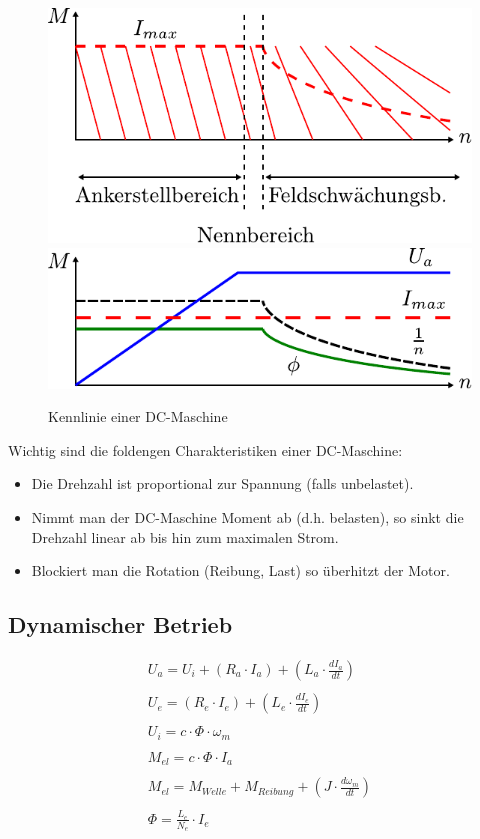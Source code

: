 \begin{figure}[h!]
\centering
\includegraphics[scale=\schscale]{dc-motor-plot1.pdf}
\includegraphics[scale=\schscale]{dc-motor-plot2.pdf}
\caption{Kennlinie einer DC-Maschine}
\label{fig:dc-motor-kennlinie}
\end{figure}

\noindent
Wichtig sind die foldengen Charakteristiken einer DC-Maschine:

\begin{itemize}
	\item Die Drehzahl ist proportional zur Spannung (falls unbelastet).
	\item Nimmt man der DC-Maschine Moment ab (d.h. belasten), so sinkt
		die Drehzahl linear ab bis hin zum maximalen Strom.
	\item	Blockiert man die Rotation (Reibung, Last) so überhitzt
		der Motor.
\end{itemize}

\subsection{Dynamischer Betrieb}
\[ \begin{array}{l}
U_a = U_i + (R_a \cdot I_a) + \left(L_a \cdot \frac{d I_a}{d t}\right) \\\\
U_e = (R_e \cdot I_e) + \left(L_e \cdot \frac{d I_e}{d t}\right) \\\\
U_i = c \cdot \Phi \cdot \omega_m \\\\
M_{el} = c \cdot \Phi \cdot I_a \\\\
M_{el} = M_{Welle} + M_{Reibung} + \left( J \cdot \frac{d \omega_m}{d t} \right) \\\\
\Phi = \frac{L_e}{N_e} \cdot I_e
\end{array} \]

